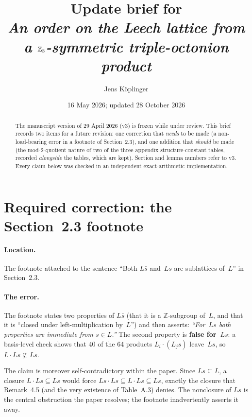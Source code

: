 \documentclass[11pt]{amsart}
\title[Update brief: order on the Leech lattice]{Update brief for\\
\emph{An order on the Leech lattice from a $\ZZ_3$-symmetric
triple-octonion product}}
\author{Jens K\"oplinger}
\date{16 May 2026; updated 28 October 2026}
\newcommand{\ZZ}{\mathbb{Z}}
\theoremstyle{remark}
\begin{document}
\maketitle

\begin{abstract}
The manuscript version of 29 April 2026 (v3) is frozen while under
review.  This brief records two items for a future revision: one
correction that \emph{needs} to be made (a non-load-bearing error in a
footnote of Section~2.3), and one addition that \emph{should} be made
(the mod-2-quotient nature of two of the three appendix
structure-constant tables, recorded \emph{alongside} the tables, which
are kept).  Section and lemma numbers refer to v3.  Every claim below
was checked in an independent exact-arithmetic implementation.
\end{abstract}

\section{Required correction: the Section~2.3 footnote}

\paragraph{Location.}
The footnote attached to the sentence ``Both $L\bar s$ and~$Ls$ are
sublattices of~$L$'' in Section~2.3.

\paragraph{The error.}
The footnote states two properties of $L\bar s$ (that it is a
$\ZZ$-subgroup of~$L$, and that it is ``closed under
left-multiplication by~$L$'') and then asserts: \emph{``For~$Ls$
both properties are immediate from $s\in L$.''}  The second property
is \textbf{false for~$Ls$}: a basis-level check shows that $40$ of the
$64$ products $L_i\cdot(L_j s)$ leave~$Ls$, so
$L\cdot Ls\not\subseteq Ls$.

The claim is moreover self-contradictory within the paper.  Since
$Ls\subseteq L$, a closure $L\cdot Ls\subseteq Ls$ would force
$Ls\cdot Ls\subseteq L\cdot Ls\subseteq Ls$, exactly the closure
that Remark~4.5 (and the very existence of Table~A.3) denies.  The
nonclosure of $Ls$ is the central obstruction the paper resolves; the
footnote inadvertently asserts it away.
\end{document}
